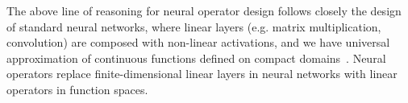 The above line of reasoning for neural operator design follows closely the design of standard neural networks, where linear layers (e.g. matrix multiplication, convolution) are composed with non-linear activations, and we have universal approximation of continuous functions defined on compact domains~\citep{hornik1989multilayer}. Neural operators replace finite-dimensional linear layers in neural networks with linear operators in function spaces.












